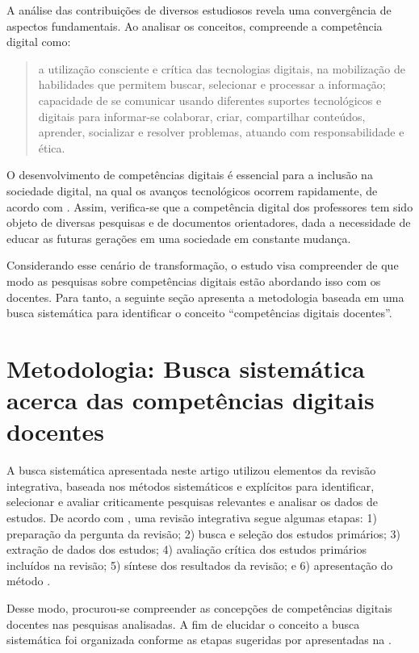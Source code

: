 \documentclass[portuguese]{textolivre}
\begin{document}
A análise das contribuições de diversos estudiosos revela uma
convergência de aspectos fundamentais. Ao analisar os conceitos, \textcite{silva2022} compreende a competência digital como:
\begin{quote}
a utilização consciente e crítica das tecnologias digitais, na
mobilização de habilidades que permitem buscar, selecionar e processar a
informação; capacidade de se comunicar usando diferentes suportes
tecnológicos e digitais para informar-se colaborar, criar, compartilhar
conteúdos, aprender, socializar e resolver problemas, atuando com
responsabilidade e ética. \cite[p.~57]{silva2022}
\end{quote}

O desenvolvimento de competências digitais é essencial para a inclusão
na sociedade digital, na qual os avanços tecnológicos ocorrem
rapidamente, de acordo com \textcite{escudero2019}. Assim,
verifica-se que a competência digital dos professores tem sido objeto de
diversas pesquisas e de documentos orientadores, dada a necessidade de
educar as futuras gerações em uma sociedade em constante mudança.

Considerando esse cenário de transformação, o estudo visa compreender de
que modo as pesquisas sobre competências digitais estão abordando isso
com os docentes. Para tanto, a seguinte seção apresenta a metodologia
baseada em uma busca sistemática para identificar o conceito
``competências digitais docentes''.



\section{Metodologia: Busca sistemática acerca das competências
digitais docentes}

A busca sistemática apresentada neste artigo utilizou elementos da
revisão integrativa, baseada nos métodos sistemáticos e explícitos para
identificar, selecionar e avaliar criticamente pesquisas relevantes e
analisar os dados de estudos. De acordo com \textcite{mendes2008}, uma revisão integrativa segue algumas etapas: 1) preparação da
pergunta da revisão; 2) busca e seleção dos estudos primários; 3)
extração de dados dos estudos; 4) avaliação crítica dos estudos
primários incluídos na revisão; 5) síntese dos resultados da revisão; e
6) apresentação do método \cite{mendes2008}.

Desse modo, procurou-se compreender as concepções de competências
digitais docentes nas pesquisas analisadas. A fim de elucidar o conceito
a busca sistemática foi organizada conforme as etapas sugeridas por
\textcite{galvao2014} apresentadas na .
\end{document}
